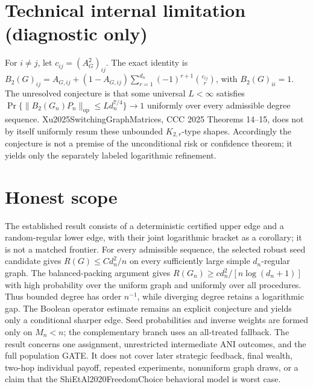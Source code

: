\documentclass{article}
\begin{document}
\section*{Technical internal limitation (diagnostic only)}

For \(i\ne j\), let \(c_{ij}=(A_G^2)_{ij}\).  The exact identity is \(B_2(G)_{ij}=A_{G,ij}+(1-A_{G,ij})\sum_{r=1}^{d_n}(-1)^{r+1}\binom{c_{ij}}r\), with \(B_2(G)_{ii}=1\).  The unresolved conjecture is that some universal \(L<\infty\) satisfies \(\Pr\{\|B_2(G_n)P_n\|_{\mathrm{op}}\le Ld_n^{7/4}\}\to1\) uniformly over every admissible degree sequence.  Xu2025SwitchingGraphMatrices, CCC 2025 Theorems 14--15, does not by itself uniformly resum these unbounded \(K_{2,r}\)-type shapes.  Accordingly the conjecture is not a premise of the unconditional risk or confidence theorem; it yields only the separately labeled logarithmic refinement.

\section{Honest scope}

The established result consists of a deterministic certified upper edge and a random-regular lower edge, with their joint logarithmic bracket as a corollary; it is not a matched frontier. For every admissible sequence, the selected robust seed candidate gives \(R(G)\le C d_n^2/n\) on every sufficiently large simple \(d_n\)-regular graph. The balanced-packing argument gives \(R(G_n)\ge c d_n^2/[n\log(d_n+1)]\) with high probability over the uniform graph and uniformly over all procedures. Thus bounded degree has order \(n^{-1}\), while diverging degree retains a logarithmic gap. The Boolean operator estimate remains an explicit conjecture and yields only a conditional sharper edge. Seed probabilities and inverse weights are formed only on \(M_n<n\); the complementary branch uses an all-treated fallback. The result concerns one assignment, unrestricted intermediate ANI outcomes, and the full population GATE. It does not cover later strategic feedback, final wealth, two-hop individual payoff, repeated experiments, nonuniform graph draws, or a claim that the ShiEtAl2020FreedomChoice behavioral model is worst case.
\end{document}
